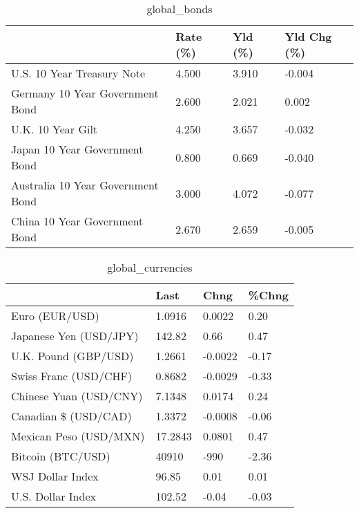 \documentclass{article}%
\begin{document}
%


\begin{table}[htbp]%
\caption{global\_bonds}%
\centering%
\begin{adjustbox}{width=1\textwidth}%
\begin{tabular}{llll}
\toprule
                                  & Rate (\%) & Yld (\%) & Yld Chg (\%) \\
\midrule
       U.S. 10 Year Treasury Note &    4.500 &   3.910 &      -0.004 \\
  Germany 10 Year Government Bond &    2.600 &   2.021 &       0.002 \\
                U.K. 10 Year Gilt &    4.250 &   3.657 &      -0.032 \\
    Japan 10 Year Government Bond &    0.800 &   0.669 &      -0.040 \\
Australia 10 Year Government Bond &    3.000 &   4.072 &      -0.077 \\
    China 10 Year Government Bond &    2.670 &   2.659 &      -0.005 \\
\bottomrule
\end{tabular}
%
\end{adjustbox}%
\end{table}

%


\begin{table}[htbp]%
\caption{global\_currencies}%
\centering%
\begin{adjustbox}{width=1\textwidth}%
\begin{tabular}{llll}
\toprule
                       &    Last &    Chng & \%Chng \\
\midrule
        Euro (EUR/USD) &  1.0916 &  0.0022 &  0.20 \\
Japanese Yen (USD/JPY) &  142.82 &    0.66 &  0.47 \\
  U.K. Pound (GBP/USD) &  1.2661 & -0.0022 & -0.17 \\
 Swiss Franc (USD/CHF) &  0.8682 & -0.0029 & -0.33 \\
Chinese Yuan (USD/CNY) &  7.1348 &  0.0174 &  0.24 \\
  Canadian \$ (USD/CAD) &  1.3372 & -0.0008 & -0.06 \\
Mexican Peso (USD/MXN) & 17.2843 &  0.0801 &  0.47 \\
     Bitcoin (BTC/USD) &   40910 &    -990 & -2.36 \\
      WSJ Dollar Index &   96.85 &    0.01 &  0.01 \\
     U.S. Dollar Index &  102.52 &   -0.04 & -0.03 \\
\bottomrule
\end{tabular}
%
\end{adjustbox}%
\end{table}
\end{document}
